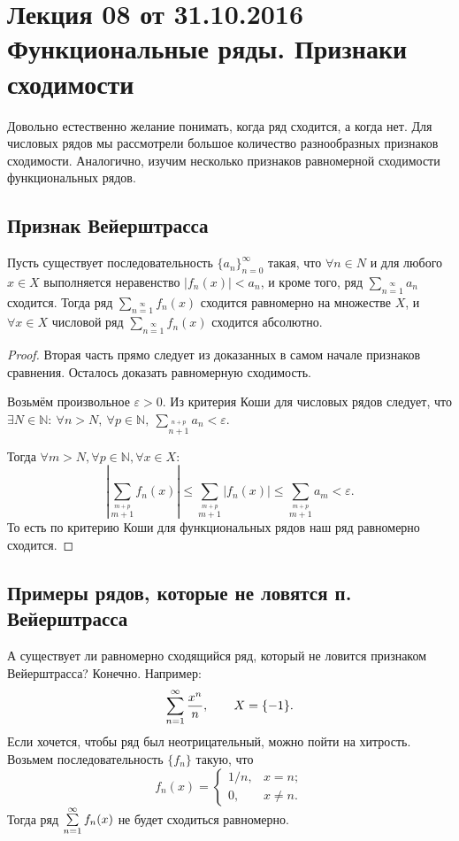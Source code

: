 \documentclass[a4paper, 12pt]{article}
\begin{document}
\pagestyle{fancy}
\section{Лекция 08 от 31.10.2016 \\ Функциональные ряды. Признаки сходимости}
	
	Довольно естественно желание понимать, когда ряд сходится, а когда нет. Для числовых рядов мы рассмотрели большое количество разнообразных признаков сходимости. Аналогично, изучим несколько признаков равномерной сходимости функциональных рядов.
	
	\subsection{Признак Вейерштрасса}
	
	\begin{Test}
		
		Пусть существует последовательность $\{a_n\}_{n=0}^\infty$ такая, что $\forall n \in N$ и для любого $x\in X$ выполняется неравенство $|f_n(x)|<a_n$, и кроме того, ряд $\sum_{n=1}\limits^{\infty}a_n$ сходится. Тогда ряд $\sum_{n=1}\limits^{\infty}f_n(x)$ сходится равномерно на множестве $X$, и $\forall x \in X$ числовой ряд $\sum_{n=1}\limits^{\infty}f_n(x)$ сходится абсолютно.
	\end{Test}
	
	\begin{proof}
		Вторая часть прямо следует из доказанных в самом начале признаков сравнения. Осталось доказать равномерную сходимость.
		
		Возьмём произвольное $\varepsilon>0$. Из критерия Коши для числовых рядов следует, что $\exists N\in \mathbb{N}: \ \forall n>N, \ \forall p\in \mathbb{N}, \ \sum_{n+1}\limits^{n+p}a_n < \varepsilon$.
		
		Тогда $\forall m>N, \forall p\in \mathbb{N}, \forall x \in X:$
		\[
		\left| \sum_{m+1}\limits^{m+p}f_n(x)\right|  \leq \sum_{m+1}\limits^{m+p} |f_n(x)| \leq  \sum_{m+1}\limits^{m+p}a_m < \varepsilon.
		\]
		То есть по критерию Коши для функциональных рядов наш ряд равномерно сходится.
	\end{proof}
	
	\subsection{Примеры рядов, которые не ловятся п. Вейерштрасса}
	
	А существует ли равномерно сходящийся ряд, который не ловится признаком Вейерштрасса? Конечно. Например:
	$$
	\sum\limits_{n=1}^{\infty} \frac{x^n}{n}, \qquad X = \{-1\}.
	$$
	Если хочется, чтобы ряд был неотрицательный, можно пойти на хитрость. Возьмем последовательность $\{f_n\}$ такую, что
	$$
	f_n(x) = \begin{cases}
	1/n, & x = n; \\
	0, & x \neq n.
	\end{cases}
	$$
	Тогда ряд $\sum\limits_{n=1}^{\infty} f_n(x)$ не будет сходиться равномерно.
	
\end{document}
